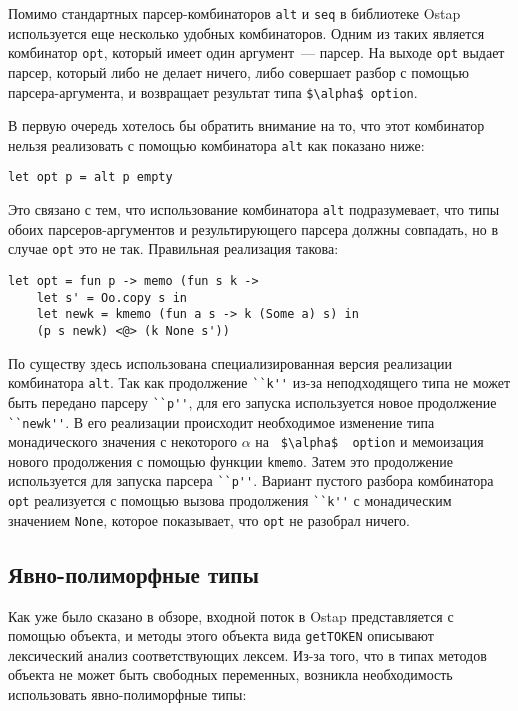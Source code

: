\documentclass[conference]{IEEEtran}
\begin{document}
Помимо стандартных парсер-комбинаторов \lstinline|alt| и \lstinline|seq| в библиотеке Ostap используется еще несколько удобных комбинаторов. Одним из таких является комбинатор
\lstinline|opt|, который имеет один аргумент~--- парсер. На выходе \lstinline|opt| выдает парсер, который либо не делает ничего, либо совершает разбор с помощью парсера-аргумента,
и возвращает результат типа \lstinline|$\alpha$ option|.

В первую очередь хотелось бы обратить внимание на то, что этот комбинатор нельзя реализовать с помощью комбинатора \lstinline|alt| как показано ниже:

\begin{lstlisting}[basicstyle=\small]
  let opt p = alt p empty
\end{lstlisting}

Это связано с тем, что использование комбинатора \lstinline|alt| подразумевает, что типы обоих парсеров-аргументов и результирующего парсера должны совпадать,
но в случае \lstinline|opt| это не так. Правильная реализация такова:

\begin{lstlisting}[basicstyle=\small]
  let opt = fun p -> memo (fun s k ->
    let s' = Oo.copy s in
    let newk = kmemo (fun a s -> k (Some a) s) in
    (p s newk) <@> (k None s'))
\end{lstlisting}

По существу здесь использована специализированная версия реализации комбинатора \lstinline|alt|. Так как продолжение \lstinline|``k''| из-за неподходящего типа не может быть передано парсеру
\lstinline|``p''|, для его запуска используется новое продолжение \lstinline|``newk''|. В его реализации происходит необходимое изменение типа монадического значения
с некоторого $\alpha$ на \lstinline| $\alpha$  option| и мемоизация нового продолжения с помощью функции \lstinline|kmemo|. Затем это продолжение используется для
запуска парсера \lstinline|``p''|. Вариант пустого разбора комбинатора \lstinline|opt| реализуется с помощью вызова продолжения \lstinline|``k''| с монадическим значением \lstinline|None|,
которое показывает, что \lstinline|opt| не разобрал ничего.

\subsection{Явно-полиморфные типы}

Как уже было сказано в обзоре, входной поток в Ostap представляется с помощью объекта, и методы этого объекта вида \lstinline|getTOKEN| описывают лексический анализ
соответствующих лексем. Из-за того, что в типах методов объекта не может быть свободных переменных, возникла необходимость использовать явно-полиморфные типы:
\end{document}
